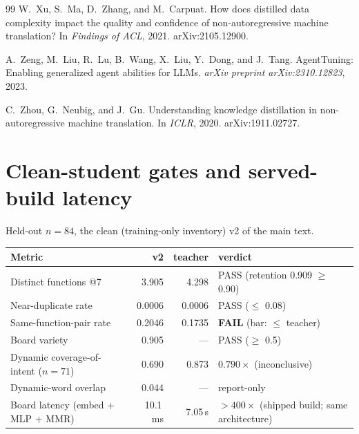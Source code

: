 \begin{thebibliography}{99}
W.~Xu, S.~Ma, D.~Zhang, and M.~Carpuat.
\newblock How does distilled data complexity impact the quality and
confidence of non-autoregressive machine translation?
\newblock In \emph{Findings of ACL}, 2021. arXiv:2105.12900.

A.~Zeng, M.~Liu, R.~Lu, B.~Wang, X.~Liu, Y.~Dong, and J.~Tang.
\newblock AgentTuning: Enabling generalized agent abilities for LLMs.
\newblock \emph{arXiv preprint arXiv:2310.12823}, 2023.

C.~Zhou, G.~Neubig, and J.~Gu.
\newblock Understanding knowledge distillation in non-autoregressive
machine translation.
\newblock In \emph{ICLR}, 2020. arXiv:1911.02727.

\end{thebibliography}

\appendix

\section{Clean-student gates and served-build latency}
\label{app:gates}

Held-out $n=84$, the clean (training-only inventory) v2 of the main text.

\begin{center}
\small
\begin{tabular}{@{}lrrl@{}}
\toprule
Metric & v2 & teacher & verdict \\
\midrule
Distinct functions @7 & 3.905 & 4.298 & PASS (retention 0.909 $\ge$ 0.90) \\
Near-duplicate rate & 0.0006 & 0.0006 & PASS ($\le$ 0.08) \\
Same-function-pair rate & 0.2046 & 0.1735 & \textbf{FAIL} (bar: $\le$ teacher) \\
Board variety & 0.905 & --- & PASS ($\ge$ 0.5) \\
Dynamic coverage-of-intent ($n=71$) & 0.690 & 0.873 & $0.790\times$ (inconclusive) \\
Dynamic-word overlap & 0.044 & --- & report-only \\
Board latency (embed + MLP + MMR) & 10.1\,ms & 7.05\,s & ${>}400\times$ (shipped build; same architecture) \\
\bottomrule
\end{tabular}
\end{center}

